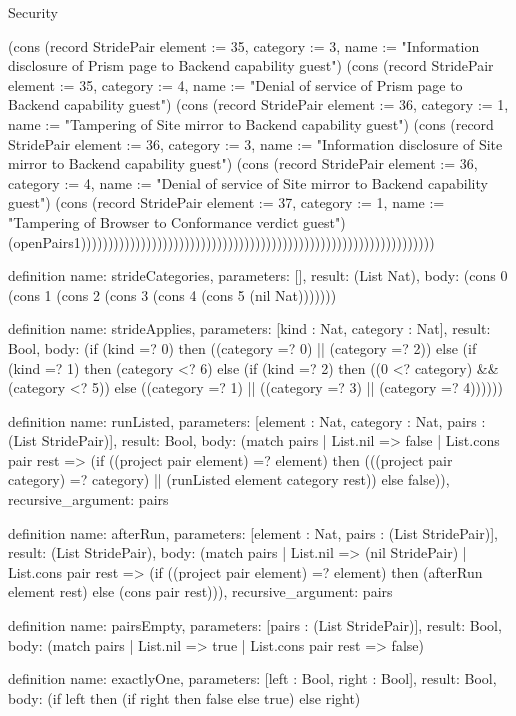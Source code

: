 \begin{lexlean}{Security}
\begin{semanticmodule}
{(cons (record StridePair {element := 35, category := 3, name := "Information disclosure of Prism page to Backend capability guest"}) (cons (record StridePair {element := 35, category := 4, name := "Denial of service of Prism page to Backend capability guest"}) (cons (record StridePair {element := 36, category := 1, name := "Tampering of Site mirror to Backend capability guest"}) (cons (record StridePair {element := 36, category := 3, name := "Information disclosure of Site mirror to Backend capability guest"}) (cons (record StridePair {element := 36, category := 4, name := "Denial of service of Site mirror to Backend capability guest"}) (cons (record StridePair {element := 37, category := 1, name := "Tampering of Browser to Conformance verdict guest"}) (openPairs1)))))))))))))))))))))))))))))))))))))))))))))))))))))))))))))))))
}

definition{
  name: strideCategories,
  parameters: [],
  result: (List Nat),
  body: (cons 0 (cons 1 (cons 2 (cons 3 (cons 4 (cons 5 (nil Nat)))))))
}

definition{
  name: strideApplies,
  parameters: [kind : Nat, category : Nat],
  result: Bool,
  body: (if (kind =? 0) then ((category =? 0) || (category =? 2)) else (if (kind =? 1) then (category <? 6) else (if (kind =? 2) then ((0 <? category) && (category <? 5)) else ((category =? 1) || ((category =? 3) || (category =? 4))))))
}

definition{
  name: runListed,
  parameters: [element : Nat, category : Nat, pairs : (List StridePair)],
  result: Bool,
  body: (match pairs
    | List.nil => false
    | List.cons pair rest => (if ((project pair element) =? element) then (((project pair category) =? category) || (runListed element category rest)) else false)),
  recursive_argument: pairs
}

definition{
  name: afterRun,
  parameters: [element : Nat, pairs : (List StridePair)],
  result: (List StridePair),
  body: (match pairs
    | List.nil => (nil StridePair)
    | List.cons pair rest => (if ((project pair element) =? element) then (afterRun element rest) else (cons pair rest))),
  recursive_argument: pairs
}

definition{
  name: pairsEmpty,
  parameters: [pairs : (List StridePair)],
  result: Bool,
  body: (match pairs | List.nil => true | List.cons pair rest => false)
}

definition{
  name: exactlyOne,
  parameters: [left : Bool, right : Bool],
  result: Bool,
  body: (if left then (if right then false else true) else right)
}


\end{semanticmodule}
\end{lexlean}
